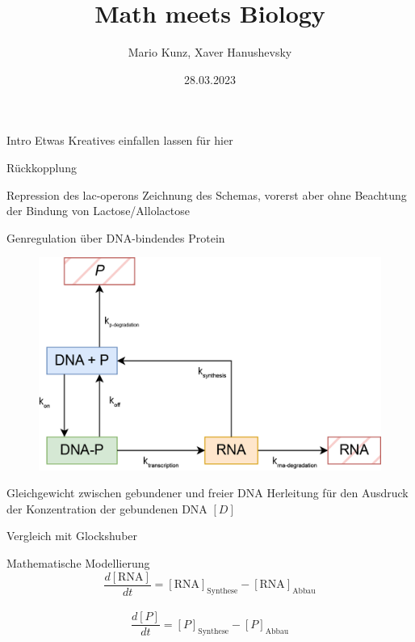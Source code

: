 \documentclass[11pt,aspectratio=169,reqno]{beamer}
\title{Math meets Biology}
\date[28.03.2023]{28.03.2023}
\author{Mario Kunz, Xaver Hanushevsky}
\institute{D-BIOL}
\begin{document}
\titleframe

\begin{frame}[fragile]{Intro}
    Etwas Kreatives einfallen lassen für hier
\end{frame}

\begin{frame}{Rückkopplung}
\end{frame}

\begin{frame}{Repression des lac-operons}
Zeichnung des Schemas, vorerst aber ohne Beachtung der Bindung von Lactose/Allolactose
\end{frame}

\begin{frame}{Genregulation über DNA-bindendes Protein}
    \begin{figure}
        \centering
        \includegraphics[width=.6\textwidth]{images/Schema Genregulation Regulation.png}
        \label{fig:my_label}
    \end{figure}
\end{frame}

\begin{frame}{Gleichgewicht zwischen gebundener und freier DNA}
Herleitung für den Ausdruck der Konzentration der gebundenen DNA $[D]$
\end{frame}

\begin{frame}{Vergleich mit Glockshuber}
\end{frame}

\begin{frame}{Mathematische Modellierung}
\begin{equation}
    \frac{d[\text{RNA}]}{dt}=[\text{RNA}]_{\text{Synthese}}-[\text{RNA}]_{\text{Abbau}}
\end{equation}
\\[12pt]
\begin{equation}
    \frac{d[P]}{dt}=[P]_{\text{Synthese}}-[P]_{\text{Abbau}}
\end{equation}
\end{frame}
\end{document}
